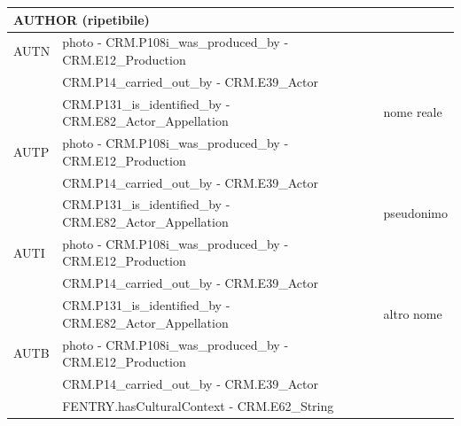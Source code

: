 \begin{center}
\begin{longtable}{ | p{1cm} | p{8cm} | p{3cm} | }
  \multicolumn{3}{|l|}{\cellcolor{lightcyan}AUTHOR (ripetibile)}\\ \hline
  AUTN &  photo - CRM.P108i\_was\_produced\_by - CRM.E12\_Production & \\
   & CRM.P14\_carried\_out\_by - CRM.E39\_Actor & \\
   & CRM.P131\_is\_identified\_by - CRM.E82\_Actor\_Appellation & nome reale \\ \hline
  AUTP &  photo - CRM.P108i\_was\_produced\_by - CRM.E12\_Production & \\
   & CRM.P14\_carried\_out\_by - CRM.E39\_Actor & \\
   & CRM.P131\_is\_identified\_by - CRM.E82\_Actor\_Appellation & pseudonimo \\ \hline
  AUTI &  photo - CRM.P108i\_was\_produced\_by - CRM.E12\_Production & \\
   & CRM.P14\_carried\_out\_by - CRM.E39\_Actor & \\
   & CRM.P131\_is\_identified\_by - CRM.E82\_Actor\_Appellation & altro nome \\ \hline
  AUTB &  photo - CRM.P108i\_was\_produced\_by - CRM.E12\_Production & \\
   & CRM.P14\_carried\_out\_by - CRM.E39\_Actor & \\
   & FENTRY.hasCulturalContext - CRM.E62\_String & \\ \hline
   

\end{longtable}
\end{center}
